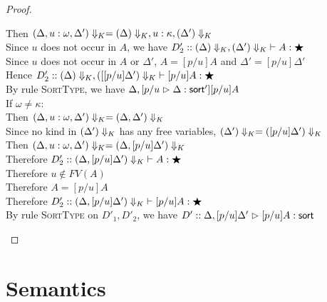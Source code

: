 \begin{proof}
\begin{enumerate}
\begin{itemize}
\begin{tabbedproof}
      \ooooo Then $\restrictkind{\Delta, u:\omega, \Delta'} = 
                     \restrictkind{\Delta}, u:\kappa, \restrictkind{\Delta'}$ \\
      \ooooo Since $u$ does not occur in $A$, we have $D'_2 :: \judgeWK[\restrictkind{\Delta}, \restrictkind{\Delta'}]
                                                        {A}{\bigstar}$ \\
      \ooooo Since $u$ does not occur in $A$ or $\Delta'$, $A = [p/u]A$ and $\Delta' = [p/u]\Delta'$ \\
      \ooooo Hence $D'_2 :: \judgeWK[\restrictkind{\Delta}, \restrictkind{[[p/u]\Delta'}]
                                                        {[p/u]A}{\bigstar}$ \\
      \ooooo By rule \textsc{SortType}, we have $\judgeSort[\Delta, [p/u]\Delta']{[p/u]A}$ \\
      \oooo If $\omega \not= \kappa$: \\
      \ooooo Then $\restrictkind{\Delta, u:\omega, \Delta'} = 
                   \restrictkind{\Delta, \Delta'}$ \\
      \ooooo Since no kind in $\restrictkind{\Delta'}$ has any free variables, 
             $\restrictkind{\Delta'} = \restrictkind{[p/u]\Delta'}$ \\
      \ooooo Then $\restrictkind{\Delta, u:\omega, \Delta'} = 
                   \restrictkind{\Delta, [p/u]\Delta'}$ \\
      \ooooo Therefore $D'_2 :: \judgeWK[\restrictkind{\Delta, [p/u]\Delta'}]
                                       {A}{\bigstar}$ \\
      \ooooo Therefore $u \not\in FV(A)$ \\
      \ooooo Therefore $A = [p/u]A$ \\
      \ooooo Therefore $D'_2 :: \judgeWK[\restrictkind{\Delta, [p/u]\Delta'}]
                                      {[p/u]A}{\bigstar}$ \\
      \ooooo By rule \textsc{SortType} on $D'_1, D'_2$, we have 
              $D' :: \judgeSort[{\Delta, [p/u]\Delta'}]{[p/u]A}$ 
      
    \end{tabbedproof}
  \end{itemize}
\end{enumerate}
\end{proof}






\section{Semantics}

